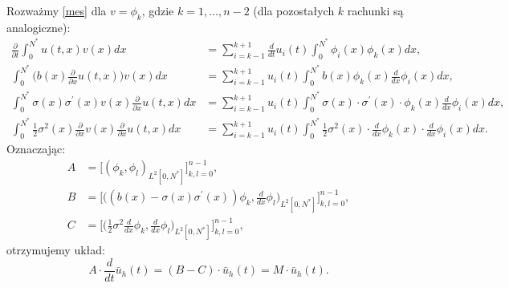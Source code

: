 \documentclass{article}
\begin{document}
Rozważmy \eqref{mes} dla $v=\phi_k$, gdzie $k=1,\dots,n-2$ (dla pozostałych $k$ rachunki są analogiczne):
\begin{align*}
\frac{\partial}{\partial t} \int_{0}^{N^{*}} u(t,x) v(x) dx &= 
\sum_{i = k-1}^{k+1} \frac{d}{d t} u_i (t) \int_{0}^{N^{*}} \phi_i (x) \phi_k (x) dx,
\\
\int_{0}^{N^{*}} \Big( b(x) \frac{\partial}{\partial x} u(t, x)\Big) v(x) dx &= \sum_{i = k-1}^{k+1} u_i (t) \int_{0}^{N^{*}} b(x) \phi_k (x)  \frac{d}{d x} \phi_i (x)  dx,
\\
\int_{0}^{N^{*}}\sigma(x) \sigma^{'}(x) v(x)\frac{\partial}{\partial x} u(t,x) dx &= 
\sum_{i = k-1}^{k+1} u_i (t) \int_{0}^{N^{*}} \sigma(x) \cdot \sigma^{'}(x) \cdot \phi_k (x) \frac{d}{d x} \phi_i (x) dx,
\\
\int_{0}^{N^{*}}\frac{1}{2} \sigma^{2}(x)  \frac{\partial}{\partial x} v(x)\frac{\partial}{\partial x} u(t,x) dx &= 
\sum_{i = k-1}^{k+1} u_i (t) \int_{0}^{N^{*}} \frac{1}{2} \sigma^{2}(x) \cdot \frac{d}{d x} \phi_k (x) \cdot \frac{d}{d x} \phi_i (x) dx.
\end{align*}
Oznaczając:
\begin{equation}\label{mes macierze}
\begin{aligned}
A &= \big[(\phi_k, \phi_l)_{L^{2}[0,N^{*}]}\big]_{k,l = 0}^{n-1},\\
B &= \big[\big((b(x) - \sigma(x) \sigma^{'}(x))\phi_k, \frac{d}{dx}\phi_l\big)_{L^{2}[0,N^{*}]}\big]_{k,l = 0}^{n-1},\\
C &= \big[\big(\frac{1}{2}\sigma^{2}\frac{d}{dx} \phi_k, \frac{d}{dx}\phi_l\big)_{L^{2}[0,N^{*}]}\big]_{k,l = 0}^{n-1},
\end{aligned}
\end{equation}
otrzymujemy układ:
\begin{equation*}
A \cdot \frac{d}{dt}\bar{u}_h (t) = (B - C) \cdot \bar{u}_h (t) = M \cdot \bar{u}_h (t).
\end{equation*}
\end{document}
